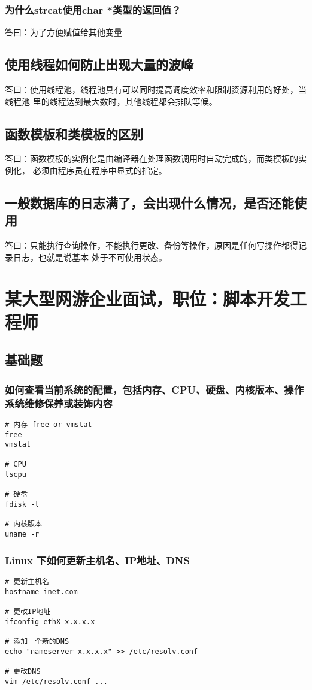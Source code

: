 \documentclass{article}
\begin{document}
\subsubsection{为什么strcat使用char *类型的返回值？}
答曰：为了方便赋值给其他变量

\subsection{使用线程如何防止出现大量的波峰}
答曰：使用线程池，线程池具有可以同时提高调度效率和限制资源利用的好处，当线程池
里的线程达到最大数时，其他线程都会排队等候。

\subsection{函数模板和类模板的区别}
答曰：函数模板的实例化是由编译器在处理函数调用时自动完成的，而类模板的实例化，
必须由程序员在程序中显式的指定。

\subsection{一般数据库的日志满了，会出现什么情况，是否还能使用}
答曰：只能执行查询操作，不能执行更改、备份等操作，原因是任何写操作都得记录日志，也就是说基本
处于不可使用状态。


\section{某大型网游企业面试，职位：脚本开发工程师}
\subsection{基础题}
\subsubsection{如何查看当前系统的配置，包括内存、CPU、硬盘、内核版本、操作系统维修保养或装饰内容}
\begin{verbatim}
# 内存 free or vmstat
free
vmstat

# CPU
lscpu

# 硬盘
fdisk -l

# 内核版本 
uname -r
\end{verbatim}

\subsubsection{Linux 下如何更新主机名、IP地址、DNS}
\begin{verbatim}
# 更新主机名
hostname inet.com

# 更改IP地址
ifconfig ethX x.x.x.x

# 添加一个新的DNS
echo "nameserver x.x.x.x" >> /etc/resolv.conf

# 更改DNS
vim /etc/resolv.conf ...

\end{verbatim}
\end{document}
